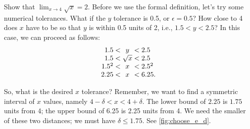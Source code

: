 \begin{example}\label{ex_compute_lim1}%
Show that $\displaystyle \lim_{x\rightarrow 4} \sqrt{x} = 2 $.
\solution
Before we use the formal definition, let's try some numerical tolerances.  What if the $y$ tolerance is 0.5, or $\epsilon =0.5$?  How close to 4 does $x$ have to be so that $y$ is within 0.5 units of 2, i.e., $1.5 < y < 2.5$?  In this case, we can proceed as follows:
\[\setlength{\arraycolsep}{0pt}
\begin{array}{rcl}
1.5 < {} & y & {} < 2.5 \\
1.5 <{} & \sqrt{x} & {}< 2.5\\
1.5^2 < {} & x & {} < 2.5^2\\
2.25 < {} & x & {} < 6.25.
\end{array}\]

So, what is the desired $x$ tolerance?  Remember, we want to find a symmetric interval of $x$ values, namely
$4 - \delta < x < 4 + \delta$.  The lower bound of $2.25$ is $1.75$ units from 4; the upper bound of 6.25 is 2.25 units from 4. We need the smaller of these two distances; we must have $\delta \leq 1.75$. See \autoref{fig:choose_e_d}.\bigskip


\end{example}
